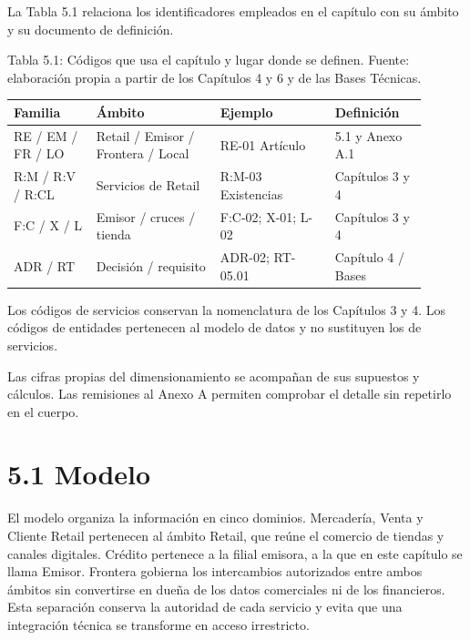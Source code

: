 \documentclass[11pt]{article}
\begin{document}
La Tabla 5.1 relaciona los identificadores empleados en el capítulo con su ámbito y su documento de definición.

\par\vspace{0.6\baselineskip}\noindent\begin{minipage}{\linewidth}
Tabla 5.1: Códigos que usa el capítulo y lugar donde se definen. Fuente: elaboración propia a partir de los Capítulos 4 y 6 y de las Bases Técnicas.\label{tab:t01}\par\vspace{0.3\baselineskip}
\begin{tabular}{@{}p{0.18\linewidth}p{0.27\linewidth}p{0.25\linewidth}p{0.20\linewidth}@{}}
\toprule Familia & Ámbito & Ejemplo & Definición \\
\midrule
RE / EM / FR / LO & Retail / Emisor / Frontera / Local & RE-01 Artículo & 5.1 y Anexo A.1 \\
R:M / R:V / R:CL & Servicios de Retail & R:M-03 Existencias & Capítulos 3 y 4 \\
F:C / X / L & Emisor / cruces / tienda & F:C-02; X-01; L-02 & Capítulos 3 y 4 \\
ADR / RT & Decisión / requisito & ADR-02; RT-05.01 & Capítulo 4 / Bases \\
\bottomrule
\end{tabular}
\end{minipage}
\par

Los códigos de servicios conservan la nomenclatura de los Capítulos 3 y 4. Los códigos de entidades pertenecen al modelo de datos y no sustituyen los de servicios.

Las cifras propias del dimensionamiento se acompañan de sus supuestos y cálculos. Las remisiones al Anexo A permiten comprobar el detalle sin repetirlo en el cuerpo.


\section{5.1 Modelo}

El modelo organiza la información en cinco dominios. Mercadería, Venta y Cliente Retail pertenecen al ámbito Retail, que reúne el comercio de tiendas y canales digitales. Crédito pertenece a la filial emisora, a la que en este capítulo se llama Emisor. Frontera gobierna los intercambios autorizados entre ambos ámbitos sin convertirse en dueña de los datos comerciales ni de los financieros. Esta separación conserva la autoridad de cada servicio y evita que una integración técnica se transforme en acceso irrestricto.
\end{document}
